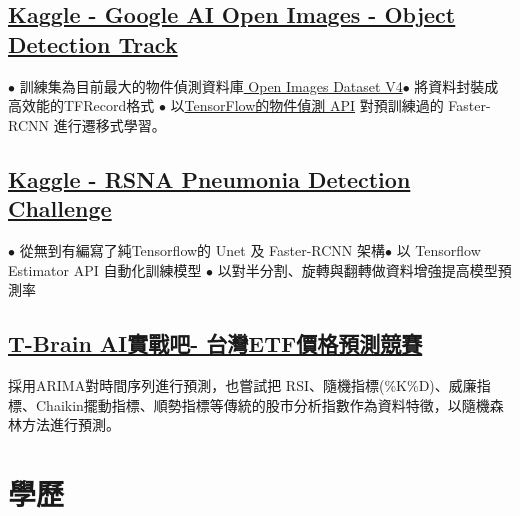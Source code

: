 \documentclass[11pt,a4paper]{moderncv}
\begin{document}
\subsection{\href{https://www.kaggle.com/c/google-ai-open-images-object-detection-track}{Kaggle - Google AI Open Images - Object Detection Track}}
{\footnotesize{$\bullet$ 訓練集為目前最大的物件偵測資料庫\href{https://storage.googleapis.com/openimages/web/index.html}{ Open Images Dataset V4}\space\space $\bullet$ 將資料封裝成高效能的TFRecord格式
\newline $\bullet$ 以\href{https://github.com/tensorflow/models/tree/master/research/object_detection}{TensorFlow的物件偵測 API} 對預訓練過的 Faster-RCNN 進行遷移式學習。}}

\subsection{\href{https://www.kaggle.com/c/rsna-pneumonia-detection-challenge}{Kaggle - RSNA Pneumonia Detection Challenge}}
{\footnotesize{$\bullet$ 從無到有編寫了純Tensorflow的 Unet 及 Faster-RCNN 架構\space\space $\bullet$ 以 Tensorflow Estimator API 自動化訓練模型
\newline $\bullet$ 以對半分割、旋轉與翻轉做資料增強提高模型預測率}}

\subsection{\href{https://tbrain.trendmicro.com.tw/Competitions/Details/2}{T-Brain AI實戰吧- 台灣ETF價格預測競賽}}
{\footnotesize{採用ARIMA對時間序列進行預測，也嘗試把 RSI、隨機指標(\%K\%D)、威廉指標、Chaikin擺動指標、順勢指標等傳統的股市分析指數作為資料特徵，以隨機森林方法進行預測。}}
\vspace{-0.6\baselineskip}

\section{學歷}
\vspace{-0.6\baselineskip}
\end{document}
